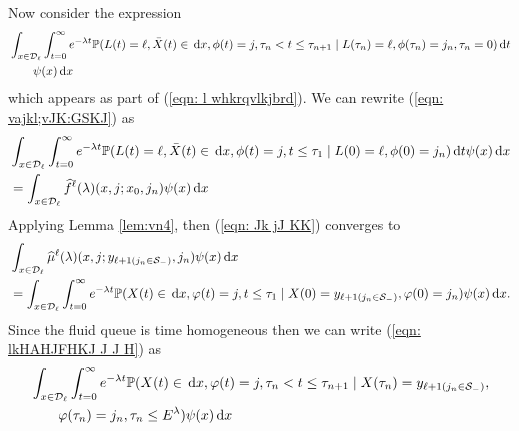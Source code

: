 Now consider the expression 
\begin{align}
	&\int_{x\in\mathcal{D}_\ell} \int_{t=0}^\infty e^{-\lambda t} \mathbb P(L(t) = \ell, \bar X(t) \in \, \mathrm{d} x, \phi(t) = j, 
	\tau_n<t \leq \tau_{n+1} \mid L(\tau_n) = \ell, \nonumber 
	 \phi(\tau_n) = j_n, \tau_{n}= 0)\, \mathrm{d} t 
	 	\\&\qquad{} \psi(x)\, \mathrm{d} x \label{eqn: vajkl;vJK:GSKJ}
\end{align}
which appears as part of (\ref{eqn: l whkrqvlkjbrd}). We can rewrite (\ref{eqn: vajkl;vJK:GSKJ}) as  
\begin{align}
	 &\int_{x\in\mathcal{D}_\ell} \int_{t=0}^\infty e^{-\lambda t} \mathbb P(L(t) = \ell, \bar X(t) \in \, \mathrm{d} x, \phi(t) = j, 
	t \leq \tau_{1} \mid L(0) = \ell, \nonumber 
	 \phi(0) = j_n)\, \mathrm{d} t \psi(x)\, \mathrm{d} x
	 \\&= \int_{x\in\mathcal{D}_\ell} \widehat f^{\ell} (\lambda)(x,j;x_0,j_n) \psi(x)\, \mathrm{d} x \label{eqn: Jk jJ KK}
\end{align}
Applying Lemma \ref{lem:vn4}, then (\ref{eqn: Jk jJ KK}) converges to 
\begin{align}
	&\int_{x\in\mathcal{D}_\ell} \widehat \mu^{\ell} (\lambda)(x,j;y_{\ell+1(j_n\in\mathcal S_-)},j_n) \psi(x)\, \mathrm{d} x \nonumber 
	\\&= \int_{x\in\mathcal{D}_\ell} \int_{t=0}^\infty e^{-\lambda t}\mathbb P(X(t)\in\, \mathrm{d} x, \varphi(t)=j, t\leq \tau_1 \mid X(0) = y_{\ell+1(j_n\in\mathcal S_-)}, \varphi(0)=j_n ) \psi(x)\, \mathrm{d} x. \label{eqn: lkHAHJFHKJ J J H}
\end{align}
Since the fluid queue is time homogeneous then we can write (\ref{eqn: lkHAHJFHKJ J J H}) as 
\begin{align}
	&\int_{x\in\mathcal{D}_\ell} \int_{t=0}^\infty e^{-\lambda t} \mathbb P(X(t)\in\, \mathrm{d} x, \varphi(t)=j, \tau_n < t \leq \tau_{n+1} \mid X(\tau_n) = y_{\ell+1(j_n\in\mathcal S_-)}, \nonumber 
	\\&\qquad{} \varphi(\tau_n)=j_n, \tau_n\leq E^\lambda ) \psi(x)\, \mathrm{d} x \label{eqn: lkHAHJFHKJ J J 22}
\end{align}

